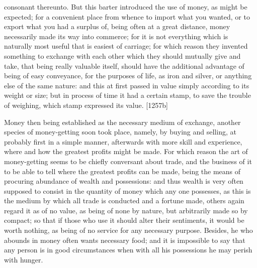 consonant thereunto. But this barter introduced the use of money, as might
be expected; for a convenient place from whence to import what you wanted,
or to export what you had a surplus of, being often at a great distance,
money necessarily made its way into commerce; for it is not everything
which is naturally most useful that is easiest of carriage; for which
reason they invented something to exchange with each other which they
should mutually give and take, that being really valuable itself, should
have the additional advantage of being of easy conveyance, for the
purposes of life, as iron and silver, or anything else of the same nature:
and this at first passed in value simply according to its weight or size;
but in process of time it had a certain stamp, to save the trouble of
weighing, which stamp expressed its value. [1257b]

Money then being established as the necessary medium of exchange, another
species of money-getting soon took place, namely, by buying and selling,
at probably first in a simple manner, afterwards with more skill and
experience, where and how the greatest profits might be made. For which
reason the art of money-getting seems to be chiefly conversant about
trade, and the business of it to be able to tell where the greatest
profits can be made, being the means of procuring abundance of wealth and
possessions: and thus wealth is very often supposed to consist in the
quantity of money which any one possesses, as this is the medium by which
all trade is conducted and a fortune made, others again regard it as of no
value, as being of none by nature, but arbitrarily made so by compact; so
that if those who use it should alter their sentiments, it would be worth
nothing, as being of no service for any necessary purpose. Besides, he who
abounds in money often wants necessary food; and it is impossible to say
that any person is in good circumstances when with all his possessions he
may perish with hunger.

